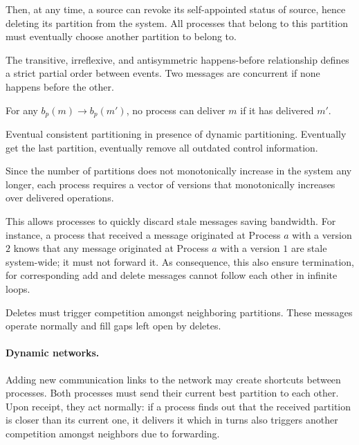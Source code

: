 Then, at any time, a source can revoke its self-appointed status of
source, hence deleting its partition from the system. All processes
that belong to this partition must eventually choose another partition
to belong to.

\begin{definition}
  The transitive, irreflexive, and antisymmetric happens-before
  relationship defines a strict partial order between events. Two
  messages are concurrent if none happens before the other.
\end{definition}
  
\begin{definition}
  For any $b_p(m) \rightarrow b_p(m')$, no process can deliver $m$ if
  it has delivered $m'$.
\end{definition}

\begin{definition}
  Eventual consistent partitioning in presence of dynamic
  partitioning. Eventually get the last partition, eventually remove
  all outdated control information.
\end{definition}

Since the number of partitions does not monotonically increase in the
system any longer, each process requires a vector of versions that
monotonically increases over delivered operations.

This allows processes to quickly discard stale messages saving
bandwidth. For instance, a process that received a message originated
at Process $a$ with a version $2$ knows that any message originated at
Process $a$ with a version $1$ are stale system-wide; it must not
forward it. As consequence, this also ensure termination, for
corresponding add and delete messages cannot follow each other in
infinite loops.

\noindent Deletes must trigger competition amongst neighboring
partitions. These  messages operate normally and fill gaps
left open by deletes. 




\paragraph{Dynamic networks.}
Adding new communication links to the network may create shortcuts
between processes. Both processes must send their current best
partition to each other. Upon receipt, they act normally: if a process
finds out that the received partition is closer than its current one,
it delivers it which in turns also triggers another competition
amongst neighbors due to forwarding.


